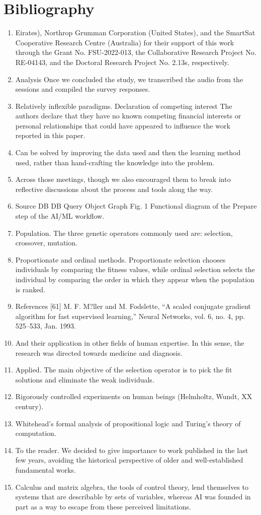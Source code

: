 \documentclass[12pt]{article}
\begin{document}
\section{Bibliography}
\begin{enumerate}
    \item Eirates), Northrop Grumman Corporation (United States), and the SmartSat Cooperative Research Centre (Australia) for their support of this work through the Grant No. FSU-2022-013, the Collaborative Research Project No. RE-04143, and the Doctoral Research Project No. 2.13s, respectively.
    \item Analysis Once we concluded the study, we transcribed the audio from the sessions and compiled the survey responses.
    \item Relatively inflexible paradigms. Declaration of competing interest The authors declare that they have no known competing financial interests or personal relationships that could have appeared to influence the work reported in this paper.
    \item Can be solved by improving the data used and then the learning method used, rather than hand-crafting the knowledge into the problem.
    \item Across those meetings, though we also encouraged them to break into reflective discussions about the process and tools along the way.
    \item Source DB DB Query Object Graph Fig. 1 Functional diagram of the Prepare step of the AI/ML workflow.
    \item Population. The three genetic operators commonly used are: selection, crossover, mutation.
    \item Proportionate and ordinal methods. Proportionate selection chooses individuals by comparing the fitness values, while ordinal selection selects the individual by comparing the order in which they appear when the population is ranked.
    \item References [61] M. F. M?ller and M. Fodslette, “A scaled conjugate gradient algorithm for fast supervised learning,” Neural Networks, vol. 6, no. 4, pp. 525–533, Jan. 1993.
    \item And their application in other fields of human expertise. In this sense, the research was directed towards medicine and diagnosis.
    \item Applied. The main objective of the selection operator is to pick the fit solutions and eliminate the weak individuals.
    \item Rigorously controlled experiments on human beings (Helmholtz, Wundt, XX century).
    \item Whitehead’s formal analysis of propositional logic and Turing’s theory of computation.
    \item To the reader. We decided to give importance to work published in the last few years, avoiding the historical perspective of older and well-established fundamental works.
    \item Calculus and matrix algebra, the tools of control theory, lend themselves to systems that are describable by sets of variables, whereas AI was founded in part as a way to escape from these perceived limitations.
\end{enumerate}
\end{document}
